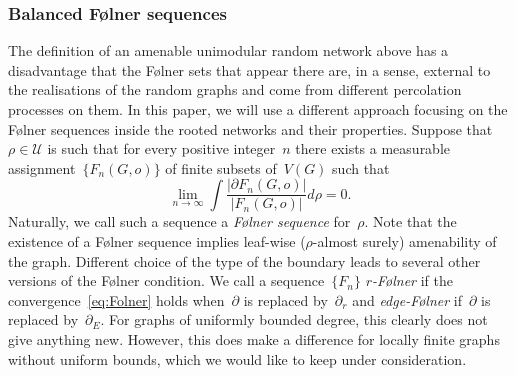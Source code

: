 \documentclass[english]{article}
\theoremstyle{definition}
\begin{document}
\subsubsection{Balanced F\o lner sequences}

The definition of an amenable unimodular random network above has a disadvantage that the F\o lner sets that appear there are, in a sense, external to the realisations of the random graphs and come from different percolation processes on them. In this paper, we will use a different approach focusing on the F\o lner sequences inside the rooted networks and their properties.
Suppose that $\rho \in \mathcal{U}$ is such that for every positive integer~$n$ there exists a measurable assignment~$\{F_n(G,o)\}$ of finite subsets of~$V(G)$ such that 
\begin{equation}\label{eq:Folner}
    \lim_{n \to \infty} \int \frac{|\partial F_n (G,o)|}{|F_n(G,o)|} d\rho= 0.
\end{equation}
Naturally, we call such a sequence a \emph{F\o lner sequence} for~$\rho$. Note that the existence of a F\o lner sequence implies leaf-wise ($\rho$-almost surely) amenability of the graph. 
Different choice of the type of the boundary leads to several other versions of the F\o lner condition. We call a sequence~$\{F_n\}$ \emph{$r$-F\o lner} if the convergence~\eqref{eq:Folner} holds when~$\partial$ is replaced by~$\partial_r$ and \emph{edge-F\o lner} if~$\partial$ is replaced by~$\partial_E$. 
For graphs of uniformly bounded degree, this clearly does not give anything new. However, this does make a difference for locally finite graphs without uniform bounds, which we would like to keep under consideration.
\end{document}
